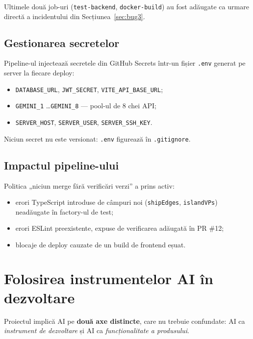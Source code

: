 \documentclass[11pt,a4paper]{article}
\begin{document}
Ultimele două job-uri (\texttt{test-backend}, \texttt{docker-build}) au fost
adăugate ca urmare directă a incidentului din Secțiunea~\ref{sec:bug3}.

\subsection{Gestionarea secretelor}

Pipeline-ul injectează secretele din GitHub Secrets într-un fișier \texttt{.env}
generat pe server la fiecare deploy:

\begin{itemize}
  \item \texttt{DATABASE\_URL}, \texttt{JWT\_SECRET}, \texttt{VITE\_API\_BASE\_URL};
  \item \texttt{GEMINI\_1} \dots \texttt{GEMINI\_8} --- pool-ul de 8 chei API;
  \item \texttt{SERVER\_HOST}, \texttt{SERVER\_USER}, \texttt{SERVER\_SSH\_KEY}.
\end{itemize}

Niciun secret nu este versionat: \texttt{.env} figurează în \texttt{.gitignore}.

\subsection{Impactul pipeline-ului}

Politica „niciun merge fără verificări verzi” a prins activ:
\begin{itemize}
  \item erori TypeScript introduse de câmpuri noi (\texttt{shipEdges},
        \texttt{islandVPs}) neadăugate în factory-ul de test;
  \item erori ESLint preexistente, expuse de verificarea adăugată în PR \#12;
  \item blocaje de deploy cauzate de un build de frontend eșuat.
\end{itemize}

\section{Folosirea instrumentelor AI în dezvoltare}

Proiectul implică AI pe \textbf{două axe distincte}, care nu trebuie confundate:
AI ca \textit{instrument de dezvoltare} și AI ca \textit{funcționalitate a
produsului}.
\end{document}
